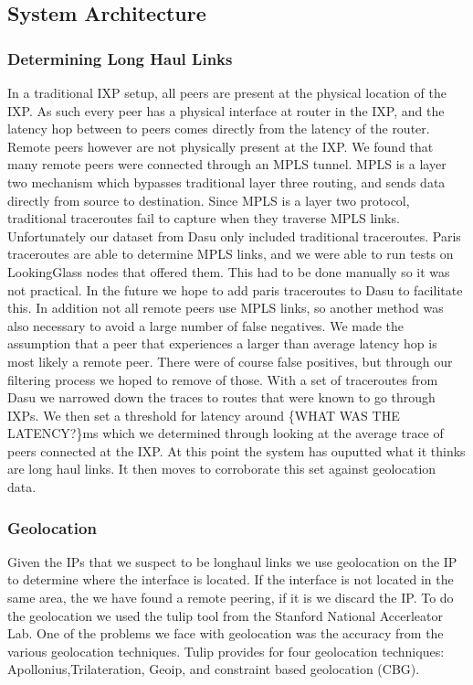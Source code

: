 \documentclass{acm_proc_article-sp}
\begin{document}
\subsection{System Architecture}
\subsubsection{Determining Long Haul Links}
In a traditional IXP setup, all peers are present at the physical location of the IXP. 
As such every peer has a physical interface at router in the IXP, and the latency hop between
to peers comes directly from the latency of the router. Remote peers however are not physically 
present at the IXP. We found that many remote peers were connected through an MPLS tunnel.
MPLS is a layer two mechanism which bypasses traditional layer three routing, and sends data directly
from source to destination. Since MPLS is a layer two protocol, traditional traceroutes fail to capture when 
they traverse MPLS links. Unfortunately our dataset from Dasu only included traditional traceroutes. Paris traceroutes
are able to determine MPLS links, and we were able to run tests on LookingGlass nodes that offered them. This had to be done
manually so it was not practical. In the future we hope to add paris traceroutes to Dasu to facilitate this. 
In addition not all remote peers use MPLS links, so another method was also necessary to avoid a large number of
false negatives.  
We made the assumption that a peer that experiences a larger than average
latency hop is most likely a remote peer. There were of course false positives, but 
through our filtering process we hoped to remove of those. With a set of traceroutes from
Dasu \cite{Sanchez:2011} we narrowed down the traces to routes that were known to go through IXPs.
We then set a threshold for latency around \{WHAT WAS THE LATENCY?\}ms which we determined through
looking at the average trace of peers connected at the IXP. At this point the system has ouputted 
what it thinks are long haul links. It then moves to corroborate this set against geolocation data.
\subsubsection{Geolocation}
Given the IPs that we suspect to be longhaul links we use geolocation on the IP to determine where
the interface is located. If the interface is not located in the same area, the we have found a 
remote peering, if it is we discard the IP. To do the geolocation we used the tulip tool from the Stanford
National Accerleator Lab. One of the problems we face with geolocation was the 
accuracy from the various geolocation techniques. Tulip provides for four geolocation techniques: Apollonius,Trilateration, Geoip, and constraint based geolocation (CBG).
\end{document}
